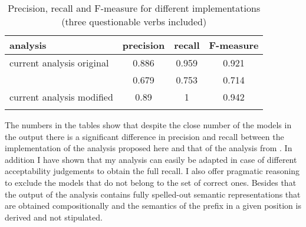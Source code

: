   \begin{table}
 \caption{Precision, recall and F-measure for different implementations (three questionable verbs included) \label{table:precision2}}
  \centering
 \begin{tabular}{l  *{3}{S[table-format=1.3]}}
 \lsptoprule
 analysis & {precision} & {recall} & {F-measure}\\ \midrule
 current analysis original & 0.886 & 0.959 &  0.921\\
 \citet{Tatevosov:09} & 0.679 & 0.753 & 0.714\\
 current analysis modified &  0.89 & 1 & 0.942\\
 \lspbottomrule
 \end{tabular}
 \end{table}
 
The numbers in the tables show that despite the close number of the models in the output there is a significant difference in precision and recall between the implementation of the analysis proposed here and that of the analysis from \citet{Tatevosov:09}. In addition I have shown that my analysis can easily be adapted in case of different acceptability judgements to obtain the full recall. I also offer pragmatic reasoning to exclude the models that do not belong to the set of correct ones. Besides that the output of the analysis contains fully spelled-out semantic representations that are obtained compositionally and the semantics of the prefix in a given position is derived and not stipulated.
